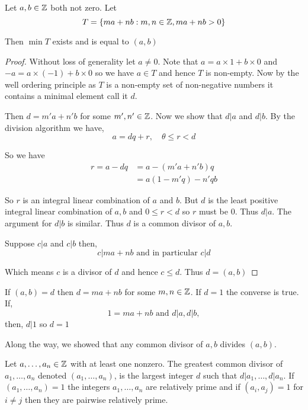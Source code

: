 \begin{prop}
    Let $a,b \in \mathbb{Z}$  both not zero. Let $$T = \{ma + nb : m,n \in \mathbb{Z}, ma + nb > 0\}$$

    Then $\min T$ exists and is equal to $(a,b)$
\end{prop}
\begin{proof}
    Without loss of generality let $a \ne 0$. Note that  $a = a \times 1 + b \times 0$ and $-a = a \times (-1) + b \times  0$  so we have $a \in T$ and hence  $T$ is non-empty. Now by the well ordering principle as $T$ is a non-empty set of non-negative numbers it contains a minimal element call it $d$.

    Then $d = m'a + n'b$ for some  $m',n' \in \mathbb{Z}$. Now we show that  $d | a$ and  $d | b$. By the division algorithm we have,  
    $$ a = dq + r, \quad \theta \le r < d $$ 

    So we have 
    \begin{align*}
        r = a - dq &= a - (m'a + n'b) q\\
                   &= a(1 - m'q) - n'qb
    \end{align*}

    So $r$ is an integral linear combination of $a$ and  $b$. But $d$ is the least positive integral linear combination of $a, b$ and $0 \le r <d$ so  $r $ must be  $0$. Thus  $d | a$. The argument for  $d | b$ is similar. Thus $d$ is a common divisor of $a,b$.

    Suppose $c | a$ and $c | b$ then,  
    $$ c | ma + nb \text{ and in particular } c | d  $$ 


    Which means $c$ is a divisor of $d$ and hence  $c \le d$. Thus  $d = (a, b)$
\end{proof}
\begin{note}
    If $(a, b) = d$ then  $d = ma + nb$ for some  $m, n \in \mathbb{Z}$. If  $d = 1$ the converse is true. If, 
    $$ 1 = ma + nb  \text{ and } d | a, d | b, $$  then, $d | 1$ so $d = 1$
\end{note}

\begin{remark}
    Along the way, we showed that any common divisor of $a,b$ divides $(a, b)$.
\end{remark}


\begin{definition}
    Let $a, \dots, a_n \in \mathbb{Z}$ with at least one nonzero. The greatest common divisor of $a_1, \dots, a_n$ denoted $(a_1, \dots, a_n)$, is the largest integer $d$ such that $d | a_1, \dots, d | a_n$. If $(a_1, \dots, a_n) = 1 $ the integers $a_1, \dots, a_n$ are relatively prime and if $(a_i, a_j) = 1$ for  $i \ne j$  then they are pairwise relatively prime. 
\end{definition}

